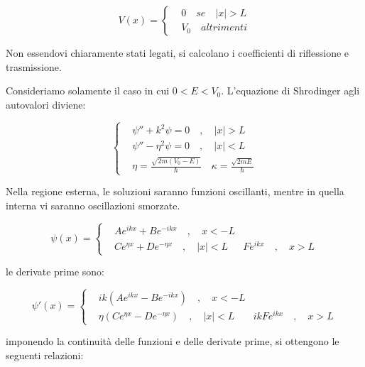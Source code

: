 \documentclass{article}
\begin{document}
\begin{equation}
    V(x)=
    \left\{
    \begin{aligned}
         & 0 \quad se \quad |x|>L \\
         & V_0 \quad altrimenti
    \end{aligned}
    \right.
\end{equation}

Non essendovi chiaramente stati legati, si calcolano i coefficienti di riflessione e trasmissione.

Consideriamo solamente il caso in cui $0<E<V_0$.
L'equazione di Shrodinger agli autovalori diviene:

\begin{equation}
    \left\{
    \begin{aligned}
         & \psi''+k^2\psi=0  \quad , \quad |x|>L                                       \\
         & \psi''-\eta^2\psi=0  \quad , \quad |x|<L                                    \\
         & \eta= \frac{\sqrt{2m(V_0-E)}}{\hbar} \quad \kappa= \frac{\sqrt{2mE}}{\hbar}
    \end{aligned}
    \right.
\end{equation}

Nella regione esterna, le soluzioni saranno funzioni oscillanti, mentre in quella interna vi saranno oscillazioni smorzate.

\begin{equation}
    \psi(x)=
    \left\{
    \begin{aligned}
         & Ae^{ikx}+Be^{-ikx} \quad , \quad x<-L        \\
         & Ce^{\eta x}+De^{-\eta x} \quad , \quad |x|<L
         & Fe^{ikx} \quad , \quad x>L
    \end{aligned}
    \right.
\end{equation}

le derivate prime sono:

\begin{equation}
    \psi'(x)=
    \left\{
    \begin{aligned}
         & ik(Ae^{ikx}-Be^{-ikx}) \quad , \quad x<-L          \\
         & \eta(Ce^{\eta x}-De^{-\eta x}) \quad , \quad |x|<L
         & ikFe^{ikx} \quad , \quad x>L
    \end{aligned}
    \right.
\end{equation}

imponendo la continuità delle funzioni e delle derivate prime, si ottengono le seguenti relazioni:
\end{document}
